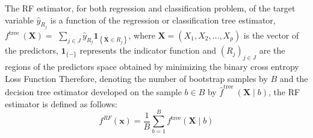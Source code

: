 \documentclass[a4,12pt]{article}
\begin{document}
The RF estimator, for both regression and classification problem, of the target variable $\hat{y}_{R_{j}}$ is a function of the regression or classification tree estimator, $f^{\text {tree }}(\mathbf{X})=$ $\sum_{j \in J} \hat{y}_{R_{j}} \mathbf{1}_{\left\{\mathbf{X} \in R_{j}\right\}}$, where $\mathbf{X}=\left(X_{1}, X_{2}, \ldots, X_{p}\right)$ is the vector of the predictors, $\mathbf{1}_{\{-\}}$ represents the indicator
function and $\left(R_{j}\right)_{j \in J}$ are the regions of the predictors space obtained by minimizing the binary cross entropy Loss Function %
Therefore, denoting the number of bootstrap samples by $B$ and the decision tree estimator developed on the sample $b \in B$ by $\hat{f}^{\text {tree }}(\mathbf{X} \mid b)$, the RF estimator is defined as follows:
$$
f^{R F}(\mathbf{x})=\frac{1}{B} \sum_{b=1}^{B} f^{\operatorname{tree}}(\mathbf{X} \mid b)
$$
\end{document}
